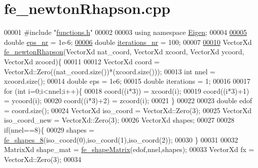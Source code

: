 \hypertarget{fe__newton_rhapson_8cpp_source}{}\section{fe\+\_\+newton\+Rhapson.\+cpp}
\label{fe__newton_rhapson_8cpp_source}

\begin{DoxyCode}
00001 \textcolor{preprocessor}{#include "\hyperlink{functions_8h}{functions.h}"}
00002 
00003 \textcolor{keyword}{using namespace }\hyperlink{namespace_eigen}{Eigen};
00004 
\hyperlink{fe__newton_rhapson_8cpp_ad3d80cd8d6370090eb6cc57a523bcd6c}{00005} \textcolor{keywordtype}{double} \hyperlink{fe__newton_rhapson_8cpp_ad3d80cd8d6370090eb6cc57a523bcd6c}{eps\_nr} = 1e-6; 
\hyperlink{fe__newton_rhapson_8cpp_a43f0d7a4e9f3ece65db80d07bb79192f}{00006} \textcolor{keywordtype}{double} \hyperlink{fe__newton_rhapson_8cpp_a43f0d7a4e9f3ece65db80d07bb79192f}{iterations\_nr} = 100;
00007 
\hyperlink{fe__newton_rhapson_8cpp_acdc9c3b5b3aecd9972c84d0cbb669978}{00010} VectorXd \hyperlink{fe__newton_rhapson_8cpp_acdc9c3b5b3aecd9972c84d0cbb669978}{fe\_newtonRhapson}(VectorXd nat\_coord, VectorXd xcoord, VectorXd ycoord, VectorXd 
      zcoord)\{
00011 
00012     VectorXd coord = VectorXd::Zero((nat\_coord.size())*(xcoord.size()));
00013     \textcolor{keywordtype}{int} nnel = xcoord.size();
00014     \textcolor{keywordtype}{double} eps = 1e6;
00015     \textcolor{keywordtype}{double} iterations = 1;
00016 
00017     \textcolor{keywordflow}{for} (\textcolor{keywordtype}{int} i=0;i<nnel;i++)\{
00018         coord((i*3)) = xcoord(i);
00019         coord((i*3)+1) = ycoord(i);
00020         coord((i*3)+2) = zcoord(i);
00021     \}
00022 
00023     \textcolor{keywordtype}{double} edof = coord.size();
00024     VectorXd iso\_coord = VectorXd::Zero(3); 
00025     VectorXd iso\_coord\_new = VectorXd::Zero(3);
00026     VectorXd shapes;
00027 
00028     \textcolor{keywordflow}{if}(nnel==8)\{
00029         shapes = \hyperlink{functions_8h_ab77a3a6d6f6b436d7e8c600bb0869927}{fe\_shapes\_8}(iso\_coord(0),iso\_coord(1),iso\_coord(2));
00030     \}
00031 
00032     MatrixXd shape\_mat = \hyperlink{functions_8h_a98fae74dde5fe33a7062e7457a2d3227}{fe\_shapeMatrix}(edof,nnel,shapes);
00033     VectorXd fx = VectorXd::Zero(3);
00034 

\end{DoxyCode}

